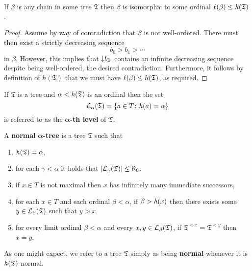 \begin{prp}\label{prp:length}
	If $\beta$ is any chain in some tree $\mathfrak{T}$ then $\beta$ is
	isomorphic to some ordinal $\ell(\beta)\leq\mathit{h}(\mathfrak{T})$.
\end{prp}
\begin{proof}
	Assume by way of contradiction that $\beta$ is not well-ordered.  There must
	then exist a strictly decreasing sequence
	\begin{equation}
		b_{0}>b_{1}>\dotsb
	\end{equation}
	in $\beta$.  However, this implies that $\left\downarrow b_{0}\right.$ contains an infinite
	decreasing sequence despite being well-ordered, the desired contradiction.
	Furthermore, it follows by definition of $h(\mathfrak{T})$ that we must have
	$\ell(\beta)\leq h(\mathfrak{T})$, as required.
\end{proof}

\begin{dfn}[Levels]
	If $\mathfrak{T}$ is a tree and $\alpha<\mathit{h}(\mathfrak{T})$ is an ordinal then the set
	\begin{equation}
		\mathcal{L}_{\alpha}(\mathfrak{T})=\left\lbrace a\in T\colon \mathit{h}(a)=\alpha \right\rbrace
	\end{equation}
	is referred to as the $\bm{\alpha}$\textbf{-th level} of $\mathfrak{T}$.
\end{dfn}

\begin{dfn}[Normality]
	A \textbf{normal }$\bm{\alpha}$\textbf{-tree} is a tree $\mathfrak{T}$ such that
	\begin{enumerate}
		\item	$\mathit{h}(\mathfrak{T})=\alpha$,\label{dfn:n1}
		\item	for each $\gamma<\alpha$ it holds that
		      $\left\lvert\mathcal{L}_{\gamma}(\mathfrak{T})\right\rvert\leq\aleph_0$,\label{dfn:n2}
		\item	if $x\in T$ is not maximal then $x$ has infinitely many
		      immediate successors,\label{dfn:n3}
		\item	for each $x\in T$ and each ordinal $\beta<\alpha$, if
		      $\beta>\mathit{h}(x)$ then there exists some $y\in\mathcal{L}_{\beta}(\mathfrak{T})$ such
		      that $y>x$,\label{dfn:n4}
		\item	for every limit ordinal $\beta<\alpha$ and every
		      $x,y\in\mathcal{L}_{\beta}(\mathfrak{T})$, if $\mathfrak{T}^{<x}=\mathfrak{T}^{<y}$
		      then $x=y$.\label{dfn:n5}
	\end{enumerate}
	As one might expect, we refer to a tree $\mathfrak{T}$ simply as being
	\textbf{normal} whenever it is $\mathit{h}(\mathfrak{T})$-normal.
\end{dfn}


